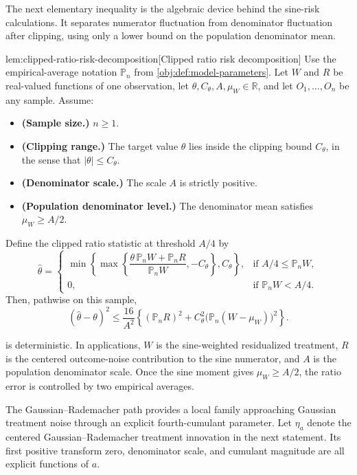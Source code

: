 The next elementary inequality is the algebraic device behind the sine-risk calculations. It separates numerator fluctuation from denominator fluctuation after clipping, using only a lower bound on the population denominator mean.

\begin{lemmav}{lem:clipped-ratio-risk-decomposition}[Clipped ratio risk decomposition]
Use the empirical-average notation \(\mathbb P_n\) from \cref{obj:def:model-parameters}. Let \(W\) and \(R\) be real-valued functions of one observation, let \(\theta,C_{\theta},A,\mu_W\in\mathbb R\), and let \(O_1,\ldots,O_n\) be any sample. Assume:
\begin{itemize}
\item \textbf{(Sample size.)} \(n\ge 1\).
\item \textbf{(Clipping range.)} The target value \(\theta\) lies inside the clipping bound \(C_{\theta}\), in the sense that \(|\theta|\le C_{\theta}\).
\item \textbf{(Denominator scale.)} The scale \(A\) is strictly positive.
\item \textbf{(Population denominator level.)} The denominator mean satisfies \(\mu_W\ge A/2\).
\end{itemize}
Define the clipped ratio statistic at threshold \(A/4\) by
\[
\widehat\theta
=
\begin{cases}
\min\!\left\{\max\!\left\{\dfrac{\theta\,\mathbb P_n W+\mathbb P_n R}{\mathbb P_n W},-C_{\theta}\right\},C_{\theta}\right\},
& \text{if } A/4\le \mathbb P_n W,\\
0,
& \text{if } \mathbb P_n W<A/4.
\end{cases}
\]
Then, pathwise on this sample,
\[
(\widehat\theta-\theta)^2
\le
\frac{16}{A^2}
\left\{
(\mathbb P_n R)^2
+
C_{\theta}^2\bigl(\mathbb P_n(W-\mu_W)\bigr)^2
\right\}.
\]
\end{lemmav}

 is deterministic. In applications, \(W\) is the sine-weighted residualized treatment, \(R\) is the centered outcome-noise contribution to the sine numerator, and \(A\) is the population denominator scale. Once the sine moment gives \(\mu_W\ge A/2\), the ratio error is controlled by two empirical averages.

The Gaussian--Rademacher path provides a local family approaching Gaussian treatment noise through an explicit fourth-cumulant parameter. Let \(\eta_a\) denote the centered Gaussian--Rademacher treatment innovation in the next statement. Its first positive transform zero, denominator scale, and cumulant magnitude are all explicit functions of \(a\).

